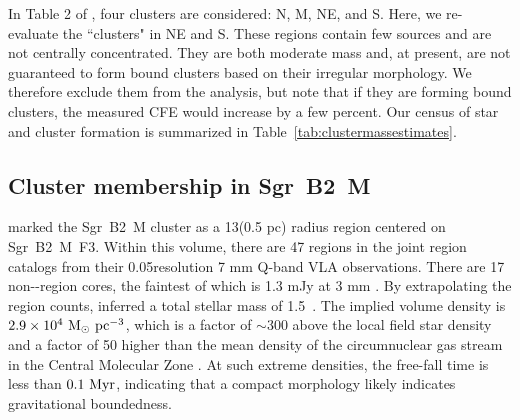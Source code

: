 \documentclass[twocolumn]{aastex62}
\begin{document}
In Table 2 of \citet{Ginsburg2018a}, four clusters are considered: N, M, NE, and
S.  Here, we re-evaluate the ``clusters" in NE and S.  These regions contain
few sources and are not centrally concentrated.
They are both moderate mass and, at present, are not guaranteed to form bound
clusters based on their irregular morphology.  We therefore exclude them from
the analysis, but note that if they are forming bound clusters, the measured
CFE would increase by a few percent. Our census of star and cluster formation
is summarized in Table~\ref{tab:clustermassestimates}.



\subsection{Cluster membership in Sgr~B2~M}
\label{sec:mmass}
\citet{Schmiedeke2016a} marked the Sgr~B2~M cluster as a 13\arcsec  (0.5 pc) radius
region centered on Sgr~B2~M~F3.  Within this volume, there are 47 \hii regions
in the joint  \hii region catalogs \citep{Gaume1995a,De-Pree2015a} from their
0.05\arcsec resolution 7 mm Q-band
VLA observations.  There are 17 non-\hii-region cores, the faintest of which is
1.3 mJy at 3 mm \citep{Ginsburg2018a}.  By extrapolating the \hii region counts,
\citet{Ginsburg2018a} inferred a total stellar mass of 1.5~\msun. The
implied volume density is $2.9\times10^4~\mathrm{M}_{\odot}~\mathrm{pc}^{-3}$, which is a factor of
$\sim300$ above the local field star density
\citep{Launhardt2002a,Kruijssen2015a} and a factor of 50 higher than the mean
density of the circumnuclear gas stream in the Central Molecular Zone
\citep[CMZ; e.g.][]{Longmore2013b}. At such extreme densities, the free-fall
time is less than $0.1~\mathrm{Myr}$, indicating that a compact morphology likely
indicates gravitational boundedness.

% 
\end{document}
